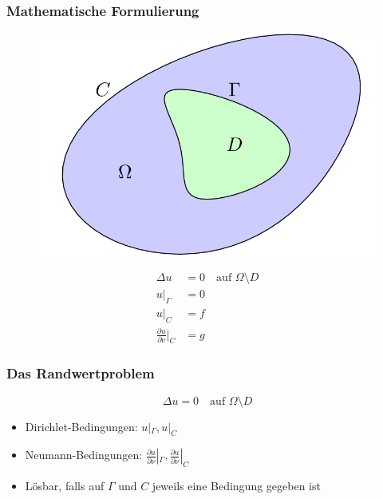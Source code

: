 \documentclass[draft]{beamer}
\begin{document}
\begin{frame}
	\frametitle{Mathematische Formulierung}
	\begin{minipage}{0.50\textwidth}
		\begin{figure}
			\centering
			\includegraphics[width=\textwidth]{tikz/basic.png}
		\end{figure}
	\end{minipage}
	\hfill
	\begin{minipage}{0.48\textwidth}
		\pause
		\begin{align*}
			\Delta u &= 0 \quad \text{auf $\Omega \setminus D$} \\
			u|_\Gamma &= 0 \\
			u|_C &= f \\
			\tfrac{\partial u}{\partial \nu}|_C &= g
		\end{align*}
	\end{minipage}
\end{frame}

\begin{frame}
	\frametitle{Das Randwertproblem}
	\[
		\Delta u = 0 \quad \text{auf $\Omega \setminus D$}
	\]
	\begin{itemize}
		\item
			Dirichlet-Bedingungen: $u|_\Gamma, u|_C$
		\item
			Neumann-Bedingungen: $\frac{\partial u}{\partial \nu}|_\Gamma, \frac{\partial u}{\partial \nu}|_C$
		\item
			Lösbar, falls auf $\Gamma$ und $C$ jeweils eine Bedingung gegeben ist
	\end{itemize}
\end{frame}
\end{document}
